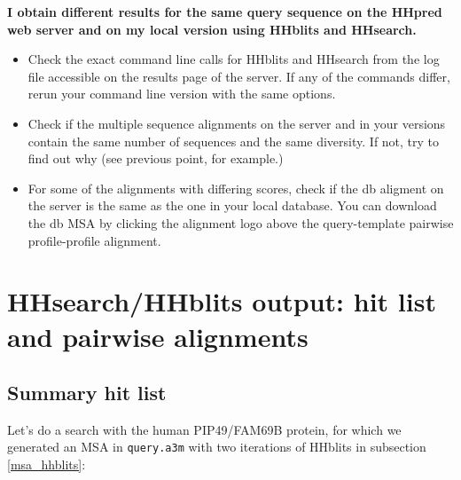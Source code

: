 \documentclass[11pt,a4paper]{article}
\begin{document}
{\bf I obtain different results for the same query sequence on the HHpred web server and on my local version using HHblits and HHsearch.}
\begin{itemize}
\item Check the exact command line calls for HHblits and HHsearch from the log file accessible on the results page of the server. If any of the commands differ, rerun your command line version with the same options. 
\item Check if the multiple sequence alignments on the server and in your versions contain the same number of sequences and the same diversity. If not, try to find out why (see previous point, for example.)
\item For some of the alignments with differing scores, check if the db aligment on the server is the same as the one in your local database. You can download the db MSA by clicking the alignment logo above the query-template pairwise profile-profile alignment.
\end{itemize}


\section{HHsearch/HHblits output: hit list and pairwise alignments}\label{outformat}

\subsection{Summary hit list}

Let's do a search with the human PIP49/FAM69B protein, for which we generated an MSA in \verb`query.a3m` with two iterations of HHblits in subsection \ref{msa_hhblits}:
\end{document}
